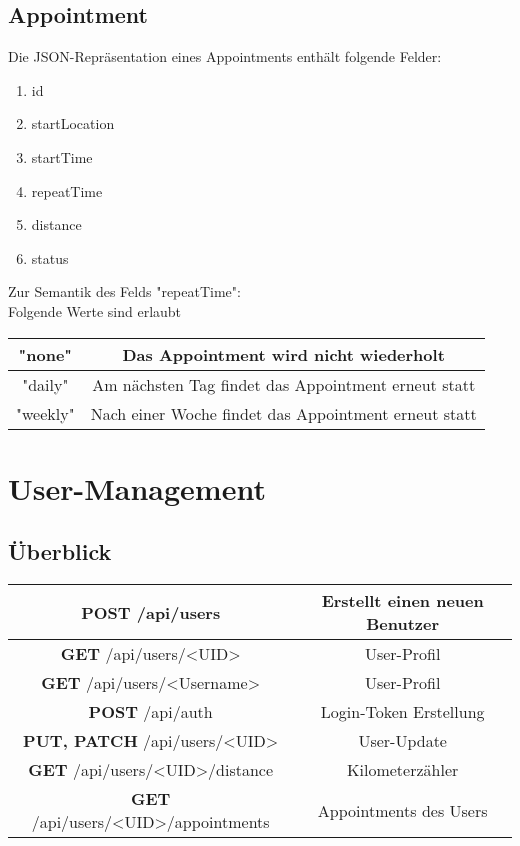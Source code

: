 \documentclass[11pt,a4paper]{article}
\begin{document}
\subsection{Appointment}
Die JSON-Repräsentation eines Appointments enthält folgende Felder:
\begin{enumerate}
    \item id
    \item startLocation
    \item startTime
    \item repeatTime
    \item distance
    \item status
\end{enumerate}
Zur Semantik des Felds "repeatTime":\\
Folgende Werte sind erlaubt

\begin{tabular}{|c|c|}
    \hline
    "none" & Das Appointment wird nicht wiederholt\\
    \hline
    "daily" & Am nächsten Tag findet das Appointment erneut statt\\
    \hline
    "weekly" & Nach einer Woche findet das Appointment erneut statt\\
    \hline
\end{tabular}


\section{User-Management}
\subsection{Überblick}
\begin{tabular}{|c|c|}
\hline
\textbf{POST} /api/users & Erstellt einen neuen Benutzer \\
\hline
\textbf{GET} /api/users/<UID> & User-Profil \\
\hline
\textbf{GET} /api/users/<Username> & User-Profil \\
\hline
\textbf{POST} /api/auth & Login-Token Erstellung \\
\hline
\textbf{PUT, PATCH} /api/users/<UID> & User-Update \\
\hline
\textbf{GET} /api/users/<UID>/distance & Kilometerzähler \\
\hline
\textbf{GET} /api/users/<UID>/appointments & Appointments des Users \\
\hline
\end{tabular}
\end{document}
